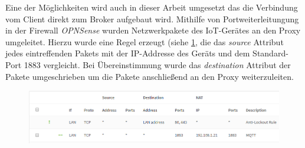     Eine der Möglichkeiten wird auch in dieser Arbeit umgesetzt das die Verbindung vom Client direkt zum Broker aufgebaut wird.
    Mithilfe von Portweiterleitungung in der Firewall \emph{OPNSense} wurden Netzwerkpakete des \ac{IoT}-Gerätes an den Proxy umgeleitet. Hierzu wurde eine Regel erzeugt (siehe \ref{fig:firewall_rule}, die das \emph{source} Attribut jedes eintreffenden Pakets mit der IP-Addresse des Geräts und dem Standard-Port 1883 vergleicht. Bei Übereinstimmung wurde das \emph{destination} Attribut der Pakete umgeschrieben um die Pakete anschließend an den Proxy weiterzuleiten.
    \begin{figure}[h]%
        \centering
        \includegraphics[width=14cm]{tex/bilder/5_implementierung/firewall.PNG}
        \label{fig:firewall_rule}
    \end{figure}
    
